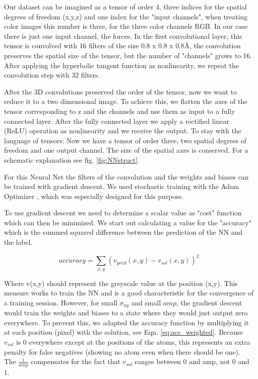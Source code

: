 \documentclass{article}
\begin{document}
Our dataset can be imagined as a tensor of order 4, three indices for the spatial degrees of freedom (x,y,z) and one index for the "input channels", when treating color images this number is three, for the three color channels RGB. In our case there is just one input channel, the forces. In the first convolutional layer, this tensor is convolved with 16 filters of the size 0.8 x 0.8 x 0.8{\AA}, the convolution preserves the spatial size of the tensor, but the number of "channels" grows to 16. After applying the hyperbolic tangent function as nonlinearity, we repeat the convolution step with 32 filters.

After the 3D convolutions preserved the order of the tensor, now we want to reduce it to a two dimensional image. To achieve this, we flatten the axes of the tensor corresponding to z and the channels and use them as input to a fully connected layer. After the fully connected layer we apply a rectified linear (ReLU) operation as nonlinearity and we receive the output. To stay with the language of tensors: Now we have a tensor of order three, two spatial degrees of freedom and one output channel. The size of the spatial axes is conserved. For a schematic explanation see fig. \ref{fig:NNstruct}.

For this Neural Net the filters of the convolution and the weights and biases can be trained with gradient descent. We used stochastic training with the Adam Optimizer \cite{kingma2014adam}, which was especially designed for this purpose. 

To use gradient descent we need to determine a scalar value as "cost" function which can then be minimized. We start out calculating a value for the "accuracy" which is the summed squared difference between the prediction of the NN and the label.

\begin{equation}
accuracy = \sum_{x, y} (v_{pred}(x,y)-v_{sol}(x,y))^2
\end{equation}

Where v(x,y) should represent the greyscale value at the position (x,y). This measure works to train the NN and is a good characteristic for the convergence of a training session. However, for small $\sigma_{xy}$ and small $amp$, the gradient descent would train the weights and biases to a state where they would just output zero everywhere. To prevent this, we adapted the accuracy function by multiplying it at each position (pixel) with the solution, see Eqn. \eqref{eq:acc_weighted}. Because $v_{sol}$ is 0 everywhere except at the positions of the atoms, this represents an extra penalty for false negatives (showing no atom even when there should be one). The $\frac{1}{amp}$ compensates for the fact that $v_{sol}$ ranges between 0 and amp, not 0 and 1.
\end{document}
